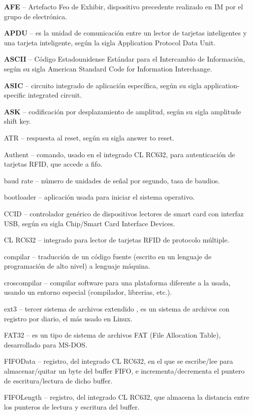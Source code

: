 \begin{glosario}

{\bf{AFE}} – Artefacto Feo de Exhibir, dispositivo precedente realizado en IM por el grupo de electrónica.

{\bf{APDU}} – es la unidad de comunicación entre un lector de tarjetas inteligentes y una tarjeta inteligente, según la sigla Application Protocol Data Unit.

{\bf{ASCII}} – Código Estadounidense Estándar para el Intercambio de Información, según su sigla American Standard Code for Information Interchange.

{\bf{ASIC}} – circuito integrado de aplicación específica, según su sigla application-specific integrated circuit.

{\bf{ASK}} – codificación por desplazamiento de amplitud, según su sigla amplitude shift key.

ATR – respuesta al reset, según su sigla answer to reset.

Authent – comando, usado en el integrado CL RC632, para autenticación de tarjetas RFID, que accede a fifo.

baud rate – número de unidades de señal por segundo, tasa de baudios.

bootloader – aplicación usada para iniciar el sistema operativo.

CCID – controlador genérico de dispositivos lectores de smart card con interfaz USB, según su sigla Chip/Smart Card Interface Devices.

CL RC632 – integrado para lector de tarjetas RFID de protocolo múltiple.

compilar – traducción de un código fuente (escrito en un lenguaje de programación de alto nivel) a lenguaje máquina.

croscompilar – compilar software para una plataforma diferente a la usada, usando un entorno especial (compilador, librerias, etc.).

ext3 – tercer sistema de archivos extendido , es un sistema de archivos con registro por diario, el más usado en Linux.

FAT32 – es un tipo de sistema de archivos FAT (File Allocation Table), desarrollado para MS-DOS.

FIFOData – registro, del integrado CL RC632, en el que se escribe/lee para almacenar/quitar un byte del buffer FIFO, e incrementa/decrementa el puntero de escritura/lectura de dicho buffer.

FIFOLength – registro, del integrado CL RC632, que almacena la distancia entre los punteros de lectura y escritura del buffer.


\end{glosario}
